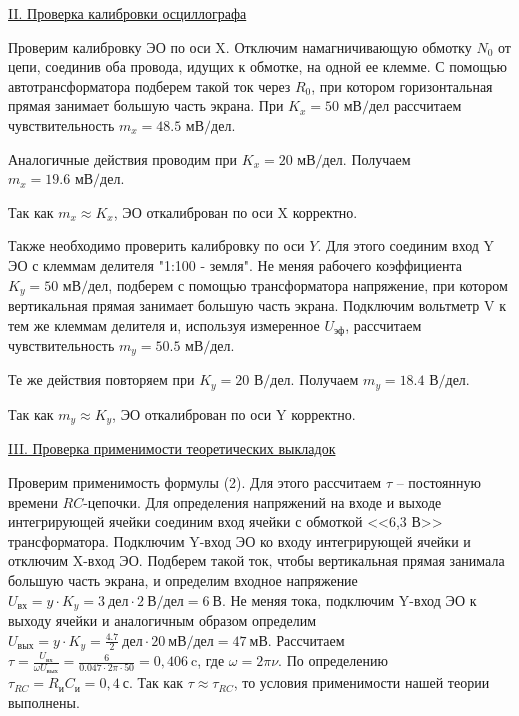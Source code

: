 \documentclass{article}
\begin{document}
\begin{center}
    \underline{\large {\RN{2}. Проверка калибровки осциллографа}}
\end{center}

Проверим калибровку ЭО по оси X. Отключим намагничивающую обмотку $N_0$ от цепи, соединив оба провода, идущих к обмотке, на одной ее клемме. С помощью автотрансформатора подберем такой ток через $R_0$, при котором горизонтальная прямая занимает большую часть экрана. При $ K_x=50 \text{ мВ/дел} $ рассчитаем чувствительность $m_x=48.5 \text{ мВ/дел}$.

Аналогичные действия проводим при $ K_x =20 \text{ мВ/дел} $. Получаем $ m_x=19.6 \text{ мВ/дел} $.

Так как $m_x \approx K_x$, ЭО откалиброван по оси X корректно.

Также необходимо проверить калибровку по оси $ Y $. Для этого соединим вход Y ЭО с клеммам делителя "1:100 - земля". Не меняя рабочего коэффициента $K_y = 50\text{ мВ/дел}$, подберем с помощью трансформатора напряжение, при котором вертикальная прямая занимает большую часть экрана. Подключим вольтметр V к тем же клеммам делителя и, используя измеренное $U_{\text{эф}}$, рассчитаем чувствительность $m_y=50.5\text{ мВ/дел}$.

Те же действия повторяем при $K_y =20 \text{ В/дел}$. Получаем $m_y=18.4\text{ В/дел}$.

Так как $m_y \approx K_y$, ЭО откалиброван по оси Y корректно.

\begin{center}
    \underline{\large {\RN{3}. Проверка применимости теоретических выкладок}}
\end{center}



Проверим применимость формулы (2). Для этого рассчитаем $\tau$ -- постоянную времени $ RC $-цепочки. Для определения напряжений на входе и выходе интегрирующей ячейки соединим вход ячейки с обмоткой <<6,3 В>> трансформатора. Подключим Y-вход ЭО ко входу интегрирующей ячейки и отключим X-вход ЭО. Подберем такой ток, чтобы вертикальная прямая занимала большую часть экрана, и определим входное напряжение $U_{\text{вх}}=y\cdot K_y=3\ \text{дел} \cdot 2\ \text{В/дел}=6\ \text{В}$. Не меняя тока, подключим Y-вход ЭО к выходу ячейки и аналогичным образом определим $U_{\text{вых}}=y\cdot K_y=\frac{4.7}{2}\ \text{дел} \cdot 20\ \text{мВ/дел}=47\ \text{мВ}$. Рассчитаем $\tau=\frac{U_{\text{вх}}}{\omega U_{\text{вых}}}=\frac{6}{0.047\cdot2\pi\cdot 50}=0,406\ \text{c}$, где $\omega=2\pi\nu$. По определению $\tau_{RC}=R_\text{и}C_\text{и}=0,4\ \text{с}$. Так как $\tau\approx\tau_{RC}$, то условия применимости нашей теории выполнены.
\end{document}
